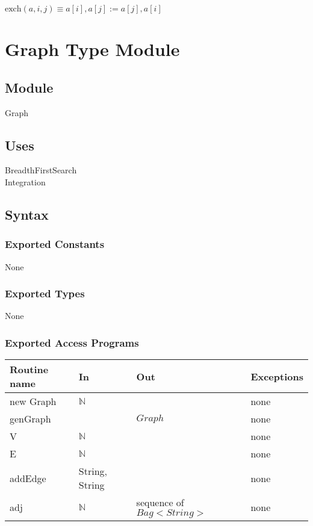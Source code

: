 \documentclass[12pt]{article}
\begin{document}
\noindent
$\text{exch}(a, i, j) \equiv a[i], a[j] := a[j], a[i]$ \\




\newpage
\section* {Graph Type Module}

\subsection*{Module}

Graph

\subsection* {Uses}

BreadthFirstSearch\\
Integration 

\subsection* {Syntax}

\subsubsection* {Exported Constants}
None



\subsubsection* {Exported Types}
None

\subsubsection* {Exported Access Programs}

\begin{tabular}{| l | l | l | p{5cm} |}
\hline
\textbf{Routine name} & \textbf{In} & \textbf{Out} & \textbf{Exceptions}\\
\hline
new Graph & $\mathbb{N}$ &  & none\\
\hline
genGraph & & $Graph$ & none\\
\hline
V & $\mathbb{N}$ &  & none\\
\hline
E & $\mathbb{N}$ &  & none\\
\hline
addEdge & String, String &  & none\\
\hline
adj & $\mathbb{N}$ & sequence of $Bag<String>$ & none\\
\hline
\end{tabular}
\end{document}
